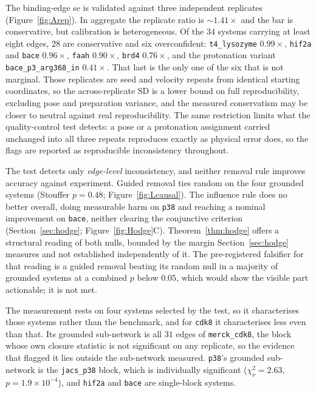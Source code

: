 The binding-edge se is validated against three independent replicates (Figure~\ref{fig:Arep}). In
aggregate the replicate ratio is $\sim$$1.41\times$ and the bar is conservative, but calibration is
heterogeneous. Of the $34$ systems carrying at least eight edges, $28$ are conservative and six
overconfident: \texttt{t4\_lysozyme} $0.99\times$, \texttt{hif2a} and \texttt{bace}
$0.96\times$, \texttt{faah} $0.90\times$, \texttt{brd4} $0.76\times$, and the protonation
variant \texttt{bace\_p3\_arg368\_in} $0.41\times$. That last is the only one of the six that is
not marginal. Those
replicates are seed and velocity repeats from identical starting coordinates, so the
across-replicate SD is a lower bound on full reproducibility, excluding pose and preparation
variance, and the measured conservatism may be closer to neutral against real reproducibility.
The same restriction limits what the quality-control test detects: a pose or a protonation
assignment carried unchanged into all three repeats reproduces exactly as physical error does, so
the flags are reported as reproducible inconsistency throughout.

The test detects only \emph{edge-level} inconsistency, and neither removal rule improves accuracy
against experiment. Guided removal ties random on the four grounded systems (Stouffer $p=0.48$;
Figure~\ref{fig:Lcausal}). The influence rule does no better overall, doing measurable harm on
\texttt{p38} and reaching a nominal improvement on \texttt{bace}, neither clearing the conjunctive
criterion (Section~\ref{sec:hodge}; Figure~\ref{fig:Hodge}C).
Theorem~\ref{thm:hodge} offers a structural reading of both nulls, bounded by the margin
Section~\ref{sec:hodge} measures and not established independently of it. The pre-registered
falsifier for that reading is a guided removal beating its random null in a majority of grounded
systems at a combined $p$ below $0.05$, which would show the visible part actionable; it is not
met.

The measurement rests on four systems selected by the test, so it characterises those systems
rather than the benchmark, and for \texttt{cdk8} it characterises less even than that. Its grounded
sub-network is all $31$ edges of \texttt{merck\_cdk8}, the block whose own closure statistic is not
significant on any replicate, so the evidence that flagged it lies outside the sub-network
measured. \texttt{p38}'s grounded
sub-network is the \texttt{jacs\_p38} block, which is individually significant ($\chi^2_\nu=2.63$,
$p=1.9\times10^{-4}$), and \texttt{hif2a} and \texttt{bace} are single-block systems.

